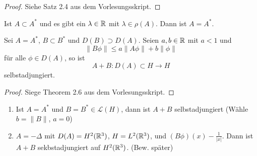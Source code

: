 \documentclass{mycourse}
\begin{document}
\begin{proof}
Siehe Satz 2.4 aus dem Vorlesungsskript.
\end{proof}
\begin{kor}
Ist $A\subset A^*$ und es gibt ein $\lambda \in \mathbb{R}$ mit $\lambda \in\rho(A)$. Dann ist $A=A^*$.
\end{kor}
\begin{st}
Sei $A=A^*$, $B\subset B^*$ und $D(B) \supset D(A)$. Seien $a,b\in \mathbb{R}$ mit $a<1$ und
\[
\|B\phi\| \le a \| A\phi\| + b \| \phi \|
\]
für alle $\phi \in D(A)$, so ist
\[
A+B: D(A) \subset H  \to H
\]
selbstadjungiert.
\end{st}
\begin{proof}
Siege Theorem 2.6 aus dem Vorlesungsskript.
\end{proof}

\begin{ex*}
\begin{enumerate}[1)]
\item Ist $A=A^*$ und $B=B^*\in \mathcal L(H)$, dann ist $A+B$ selbstadjungiert (Wähle $b=\| B\|$, $a=0$)
\item $A=-\Delta$ mit $D(A) = H^2(\mathbb{R}^3)$, $H=L^2(\mathbb{R}^3)$, und $(B\phi)(x) -\frac{1}{|x|}$. Dann ist $A+B$ sekbstadjungiert auf $H^2(\mathbb{R}^3)$. (Bew. später)
\end{enumerate}
\end{ex*}
\end{document}

